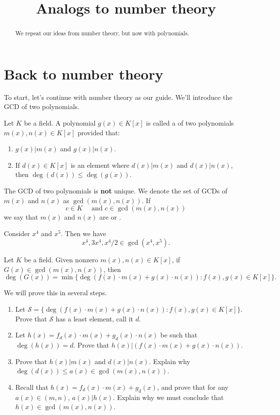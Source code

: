\documentclass{ximera}
\title{Analogs to number theory}
\begin{document}
\begin{abstract}
  We repeat our ideas from number theory, but now with polynomials.
\end{abstract}
\maketitle


\section{Back to number theory}


To start, let's continue with number theory as our guide. We'll
introduce the GCD of two polynomials.

\begin{definition}
  Let $K$ be a field. A polynomial $g(x)\in K[x]$ is called a
   of two polynomials $m(x),n(x)\in K[x]$
  provided that:
  \begin{enumerate}
  \item $g(x) | m(x)$ and $g(x) | n(x)$.
  \item If $d(x)\in K[x]$ is an element where $d(x)| m(x)$ and $d(x) | n(x)$, then $\deg(d(x))\le \deg(g(x))$.
  \end{enumerate}
  The GCD of two polynomials is \textbf{not} unique.  We denote the set of GCDs
  of $m(x)$ and $n(x)$ as $\gcd(m(x),n(x))$. If
  \[
  c\in K\quad\text{ and }c\in \gcd(m(x),n(x))
  \]
  we say that $m(x)$ and $n(x)$ are  or .
\end{definition}


\begin{example}
  Consider $x^4$ and $x^5$. Then we have
  \[
  x^4, 3x^4, x^4/2 \in \gcd(x^4,x^5).
  \]
\end{example}

\begin{theorem}\label{T:ELP1}
  Let $K$ be a field. Given nonzero $m(x),n(x)\in K[x]$, if $G(x)\in
  \gcd(m(x),n(x))$, then
  \[
  \deg(G(x)) = \min\{\deg(f(x)\cdot m(x) +g(x)\cdot n(x)): f(x),g(x)\in K[x]\}.
  \]
  \begin{sketch} We will prove this in several steps.
  \begin{enumerate}
  \item Let $\mathcal S = \{\deg(f(x)\cdot m(x) +g(x)\cdot n(x)):
    f(x),g(x)\in K[x]\}$. Prove that $\mathcal S$ has a least element,
    call it $d$.
  \item Let $h(x) = f_d(x)\cdot m(x) +g_d(x)\cdot n(x)$ be such that
    $\deg(h(x)) = d$. Prove that $h(x)| (f(x)\cdot m(x) +g(x)\cdot n(x))$.
  \item Prove that $h(x)| m(x)$ and $d(x)| n(x)$. Explain why $\deg(d(x)) \le a(x)\in\gcd(m(x),n(x))$.
  \item Recall that $h(x) = f_d(x)\cdot m(x) +g_d(x)$, and prove that
    for any $a(x)\in(m,n)$, $a(x) | h(x)$. Explain why we must
    conclude that $h(x)\in\gcd(m(x),n(x))$.
  \end{enumerate}
  \end{sketch}
\end{theorem}
\end{document}

